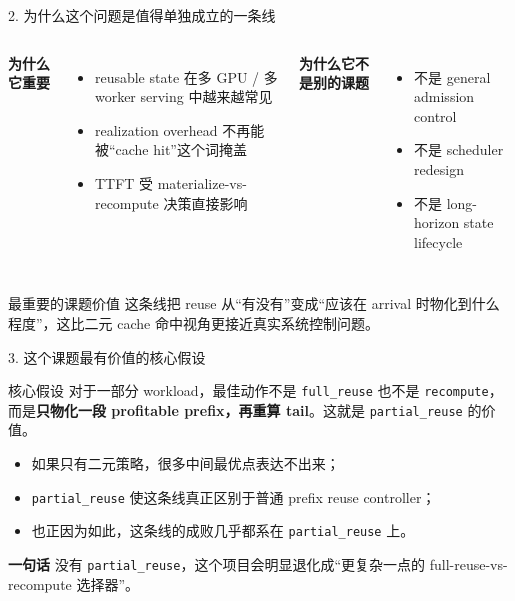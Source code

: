 \documentclass[10pt,aspectratio=169]{ctexbeamer}
\begin{document}
\begin{frame}{2. 为什么这个问题是值得单独成立的一条线}
\begin{columns}[T]
\textbf{为什么它重要}
\begin{itemize}
  \item reusable state 在多 GPU / 多 worker serving 中越来越常见
  \item realization overhead 不再能被“cache hit”这个词掩盖
  \item TTFT 受 materialize-vs-recompute 决策直接影响
\end{itemize}

\textbf{为什么它不是别的课题}
\begin{itemize}
  \item 不是 general admission control
  \item 不是 scheduler redesign
  \item 不是 long-horizon state lifecycle
\end{itemize}
\end{columns}

\vspace{0.4em}
\begin{alertblock}{最重要的课题价值}
这条线把 reuse 从“有没有”变成“应该在 arrival 时物化到什么程度”，这比二元 cache 命中视角更接近真实系统控制问题。
\end{alertblock}
\end{frame}

\begin{frame}{3. 这个课题最有价值的核心假设}
\begin{block}{核心假设}
对于一部分 workload，最佳动作不是 \texttt{full\_reuse} 也不是 \texttt{recompute}，而是\textbf{只物化一段 profitable prefix，再重算 tail}。这就是 \texttt{partial\_reuse} 的价值。
\end{block}

\begin{itemize}
  \item 如果只有二元策略，很多中间最优点表达不出来；
  \item \texttt{partial\_reuse} 使这条线真正区别于普通 prefix reuse controller；
  \item 也正因为如此，这条线的成败几乎都系在 \texttt{partial\_reuse} 上。
\end{itemize}

\vspace{0.4em}
\textbf{一句话}
没有 \texttt{partial\_reuse}，这个项目会明显退化成“更复杂一点的 full-reuse-vs-recompute 选择器”。
\end{frame}
\end{document}
